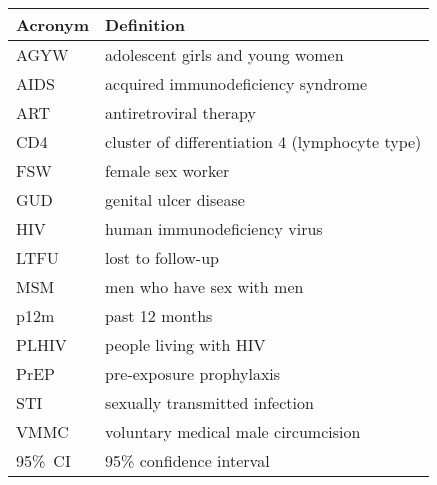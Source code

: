 \begin{tabular}{ll}
  \toprule
  Acronym & Definition \\
  \midrule
  AGYW    & adolescent girls and young women \\
  AIDS    & acquired immunodeficiency syndrome \\
  ART     & antiretroviral therapy \\
  CD4     & cluster of differentiation 4 (lymphocyte type) \\
  FSW     & female sex worker \\
  GUD     & genital ulcer disease \\
  HIV     & human immunodeficiency virus \\
  LTFU    & lost to follow-up \\
  MSM     & men who have sex with men \\
  p12m    & past 12 months \\
  PLHIV   & people living with HIV \\
  PrEP    & pre-exposure prophylaxis \\
  STI     & sexually transmitted infection \\
  VMMC    & voluntary medical male circumcision \\
  95\%~CI & 95\% confidence interval \\
  \bottomrule
\end{tabular}